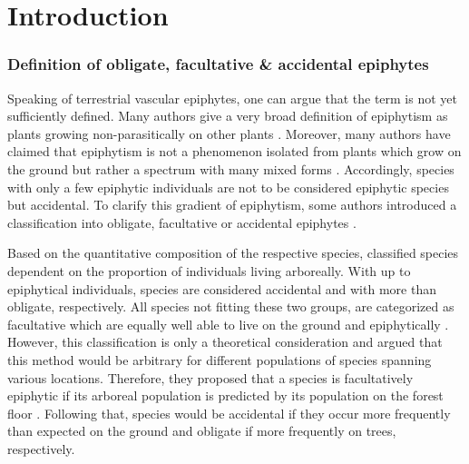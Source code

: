 \documentclass[12pt, a4paper, oneside, draft]{scrartcl}
\begin{document}
 \doublespacing





\newpage


\section{Introduction}

	\subsubsection*{Definition of obligate, facultative \& accidental epiphytes}
	Speaking of terrestrial vascular epiphytes, one can argue that the term is not yet sufficiently defined. Many authors give a very broad definition of epiphytism as plants growing non-parasitically on other plants \parencite[e.g.][]{Zotz2016, Burns2010, Benzing2012, Brown1948, Schimper1903}. Moreover, many authors have claimed that epiphytism is not a phenomenon isolated from plants which grow on the ground but rather a spectrum with many mixed forms \parencite[e.g.][]{Zotz2016}. Accordingly, species with only a few epiphytic individuals are not to be considered epiphytic species but accidental. To clarify this gradient of epiphytism, some authors introduced a classification into obligate, facultative or accidental epiphytes \parencite{Ibisch1996, Benzing2004}. 
	
	Based on the quantitative composition of the respective species, \textcite{Ibisch1996} classified species dependent on the proportion of individuals living arboreally. With up to  epiphytical individuals, species are considered accidental and with more than  obligate, respectively. All species not fitting these two groups, are categorized as facultative which are equally well able to live on the ground and epiphytically  \parencite{Ibisch1996}. However, this classification is only a theoretical consideration and \textcite{Burns2010} argued that this method would be arbitrary for different populations of species spanning various locations. Therefore, they proposed that a species is facultatively epiphytic if its arboreal population is predicted by its population on the forest floor \parencite{Burns2010}. Following that, species would be accidental if they occur more frequently than expected on the ground and obligate if more frequently on trees, respectively.
	
\end{document}
